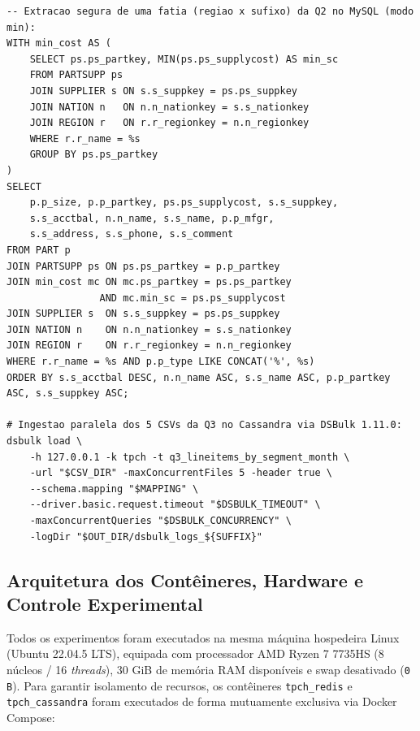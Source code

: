 \documentclass[12pt,a4paper]{article}
\begin{document}
\begin{lstlisting}[caption={Consulta CTE fatiada da Q2 (\texttt{load\_q2.py}) e ingestão paralela via DSBulk (\texttt{load\_q3\_dsbulk.sh}).}]
-- Extracao segura de uma fatia (regiao x sufixo) da Q2 no MySQL (modo min):
WITH min_cost AS (
    SELECT ps.ps_partkey, MIN(ps.ps_supplycost) AS min_sc
    FROM PARTSUPP ps
    JOIN SUPPLIER s ON s.s_suppkey = ps.ps_suppkey
    JOIN NATION n   ON n.n_nationkey = s.s_nationkey
    JOIN REGION r   ON r.r_regionkey = n.n_regionkey
    WHERE r.r_name = %s
    GROUP BY ps.ps_partkey
)
SELECT
    p.p_size, p.p_partkey, ps.ps_supplycost, s.s_suppkey,
    s.s_acctbal, n.n_name, s.s_name, p.p_mfgr,
    s.s_address, s.s_phone, s.s_comment
FROM PART p
JOIN PARTSUPP ps ON ps.ps_partkey = p.p_partkey
JOIN min_cost mc ON mc.ps_partkey = ps.ps_partkey
                AND mc.min_sc = ps.ps_supplycost
JOIN SUPPLIER s  ON s.s_suppkey = ps.ps_suppkey
JOIN NATION n    ON n.n_nationkey = s.s_nationkey
JOIN REGION r    ON r.r_regionkey = n.n_regionkey
WHERE r.r_name = %s AND p.p_type LIKE CONCAT('%', %s)
ORDER BY s.s_acctbal DESC, n.n_name ASC, s.s_name ASC, p.p_partkey ASC, s.s_suppkey ASC;

# Ingestao paralela dos 5 CSVs da Q3 no Cassandra via DSBulk 1.11.0:
dsbulk load \
    -h 127.0.0.1 -k tpch -t q3_lineitems_by_segment_month \
    -url "$CSV_DIR" -maxConcurrentFiles 5 -header true \
    --schema.mapping "$MAPPING" \
    --driver.basic.request.timeout "$DSBULK_TIMEOUT" \
    -maxConcurrentQueries "$DSBULK_CONCURRENCY" \
    -logDir "$OUT_DIR/dsbulk_logs_${SUFFIX}"
\end{lstlisting}

\subsection{Arquitetura dos Contêineres, Hardware e Controle Experimental}
Todos os experimentos foram executados na mesma máquina hospedeira Linux (Ubuntu 22.04.5 LTS), equipada com processador AMD Ryzen 7 7735HS (8 núcleos / 16 \textit{threads}), 30 GiB de memória RAM disponíveis e swap desativado (\texttt{0 B}). Para garantir isolamento de recursos, os contêineres \texttt{tpch\_redis} e \texttt{tpch\_cassandra} foram executados de forma mutuamente exclusiva via Docker Compose:
\end{document}
